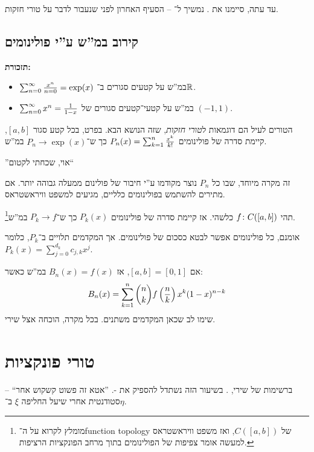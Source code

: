 \documentclass[]{../../../../tex/classes/styledArticle}
\begin{document}
	עד עתה, סיימנו את . נמשיך ל־ – הסעיף האחרון לפני שנעבור לדבר על טורי חזקות. 
	\subsection*{קירוב במ''ש ע''י פולינומים}
	\textbf{תזכורת: }
	\begin{itemize}
		\item $\sum_{n = 0}^{\infty} \frac{x^{n}}{n = 0} = \exp(x)$ במ''ש על קטעים סגורים ב־$\mathbb{R}$. 
		\item $\sum_{n = 0}^{\infty} x^{n} = \frac{1}{1- x}$ במ''ש על קטעי־קטעים סגורים של $(-1, 1)$. 
	\end{itemize}
	הטורים לעיל הם דוגמאות ל\textit{טורי חזקות}, שזה הנושא הבא. בפרט, בכל קטע סגור $[a, b]$, קיימת סדרה של פולינומים $P_n(x) = \sum_{k = 1}^{n} \frac{x^{k}}{k!}$ כך ש־$P_n \to \exp(x)$ במ''ש. 
	
	''אוי, שכחתי לקטום``
	
	זה מקרה מיוחד, שבו כל $P_n$ נוצר מקודמו ע''י חיבור של פולינום ממעלה גבוהה יותר. אם מתירים להשתמש בפולינומים כלליים, מגיעים למשפט וויראשטראס. 
	\begin{Theorem}[וויראטשראס]
		תהי $f \colon C([a, b])$ כלשהי. אז קיימת סדרה של פולינומים $P_k(x)$ כך ש־$P_k \to f$ במ''ש\footnote{מומלץ לקרוא על ה־function topology של $C([a, b])$, ואז משפט וויראשטראס למעשה אומר צפיפות של הפולינומים בתוך מרחב הפונקציות הרציפות. }. 
	\end{Theorem}
	אומנם, כל פולינומים אפשר לבטא כסכום של פולינומים. אך המקדמים תלויים ב־$P_k$, כלומר $P_k(x) = \sum_{j = 0}^{d_k}c_{j, k}x^{j}$. 
	
	אם $[a, b] = [0, 1]$, אז $B_n(x) = f(x)$ במ''ש כאשר: 
	\[ B_n(x) = \sum_{k = 1}^{n} \binom{n}{k}f\left ( \frac{n}{k} \right )x^{k}(1 - x)^{n - k} \]
	שימו לב שכאן המקדמים משתנים. בכל מקרה, הוכחה אצל שירי. 
	
	\section*{טורי פונקציות}
	ברשימות של שירי, . בשיעור הזה נשתדל להספיק את -. 
	''אטא זה פשוט קשקוש אחר`` – סטודנטית אחרי שיעל החליפה $\xi$ ב־$\eta$. 
	
\end{document}
